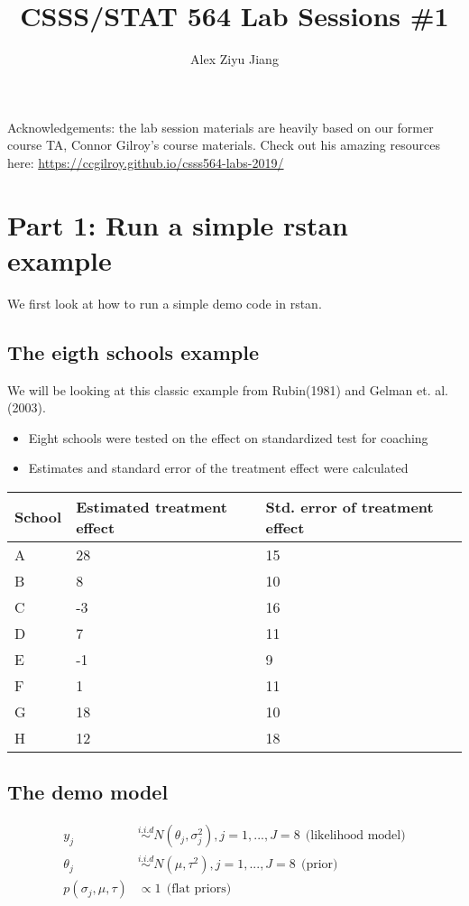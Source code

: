 \documentclass[]{article}
\title{CSSS/STAT 564 Lab Sessions \#1}
\author{Alex Ziyu Jiang}
\date{}
\providecommand{\tightlist}{%
  \setlength{\itemsep}{0pt}\setlength{\parskip}{0pt}}
\begin{document}
\maketitle

Acknowledgements: the lab session materials are heavily based on our
former course TA, Connor Gilroy's course materials. Check out his
amazing resources here:
\url{https://ccgilroy.github.io/csss564-labs-2019/}

\section{Part 1: Run a simple rstan
example}\label{part-1-run-a-simple-rstan-example}

We first look at how to run a simple demo code in rstan.

\subsection{The eigth schools example}\label{the-eigth-schools-example}

We will be looking at this classic example from Rubin(1981) and Gelman
et. al.(2003).

\begin{itemize}
\tightlist
\item
  Eight schools were tested on the effect on standardized test for
  coaching
\item
  Estimates and standard error of the treatment effect were calculated
\end{itemize}

\begin{longtable}[]{@{}lll@{}}
\toprule
School & Estimated treatment effect & Std. error of treatment
effect\tabularnewline
\midrule
\endhead
A & 28 & 15\tabularnewline
B & 8 & 10\tabularnewline
C & -3 & 16\tabularnewline
D & 7 & 11\tabularnewline
E & -1 & 9\tabularnewline
F & 1 & 11\tabularnewline
G & 18 & 10\tabularnewline
H & 12 & 18\tabularnewline
\bottomrule
\end{longtable}

\subsection{The demo model}\label{the-demo-model}

\begin{align*}
y_j &\stackrel{i.i.d}{\sim} N(\theta_j, \sigma_j^2), j = 1,...,J=8~~\text{(likelihood model)}  \\
\theta_j &\stackrel{i.i.d}{\sim} N(\mu , \tau^2), j = 1,...,J=8~~\text{(prior)} \\
p(\sigma_j,\mu, \tau) &\propto 1 ~~\text{(flat priors)}
\end{align*}
\end{document}
